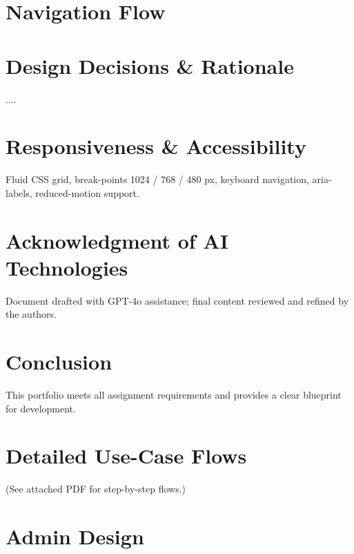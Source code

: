 \documentclass[11pt,a4paper]{article}
\begin{document}
	\section{Navigation Flow}\label{sec:navigation-flow}

	\section{Design Decisions \& Rationale}\label{sec:design-decisions-&-rationale}
	....
	\section{Responsiveness \& Accessibility}\label{sec:responsiveness-&-accessibility}
	Fluid CSS grid, break-points 1024 / 768 / 480 px, keyboard navigation, aria-labels, reduced-motion support.
	
	\section{Acknowledgment of AI Technologies}\label{sec:acknowledgment-of-ai-technologies}
	Document drafted with GPT-4o assistance; final content reviewed and refined by the authors.
	
	\section{Conclusion}\label{sec:conclusion}
	This portfolio meets all assignment requirements and provides a clear blueprint for development.
	
	\appendix
	\section{Detailed Use-Case Flows}\label{sec:usecases}
	(See attached PDF for step-by-step flows.)








\section{Admin Design}\label{sec:admin-design}
	\vspace{0.3cm}
\end{document}
